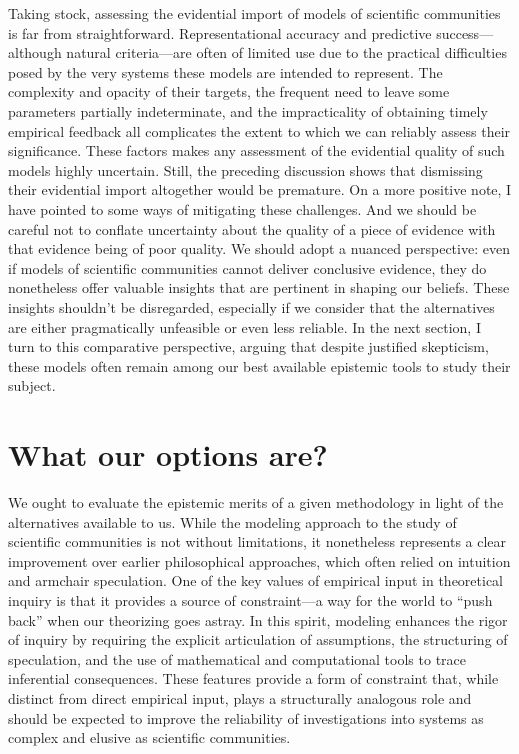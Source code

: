 \documentclass{article}
\begin{document}
Taking stock, assessing the evidential import of models of scientific communities is far from straightforward. Representational accuracy and predictive success—although natural criteria—are often of limited use due to the practical difficulties posed by the very systems these models are intended to represent. The complexity and opacity of their targets, the frequent need to leave some parameters partially indeterminate, and the impracticality of obtaining timely empirical feedback all complicates the extent to which we can reliably assess their significance. These factors makes any assessment of the evidential quality of such models highly uncertain. Still, the preceding discussion shows that dismissing their evidential import altogether would be premature. On a more positive note, I have pointed to some ways of mitigating these challenges. And we should be careful not to conflate uncertainty about the quality of a piece of evidence with that evidence being of poor quality. We should adopt a nuanced perspective: even if models of scientific communities cannot deliver conclusive evidence, they do nonetheless offer valuable insights that are pertinent in shaping our beliefs. These insights shouldn't be disregarded, especially if we consider that the alternatives are either pragmatically unfeasible or even less reliable. In the next section, I turn to this comparative perspective, arguing that despite justified skepticism, these models often remain among our best available epistemic tools to study their subject.


\section{What our options are?}

We ought to evaluate the epistemic merits of a given methodology in light of the alternatives available to us. While the modeling approach to the study of scientific communities is not without limitations, it nonetheless represents a clear improvement over earlier philosophical approaches, which often relied on intuition and armchair speculation. One of the key values of empirical input in theoretical inquiry is that it provides a source of constraint—a way for the world to “push back” when our theorizing goes astray. In this spirit, modeling enhances the rigor of inquiry by requiring the explicit articulation of assumptions, the structuring of speculation, and the use of mathematical and computational tools to trace inferential consequences. These features provide a form of constraint that, while distinct from direct empirical input, plays a structurally analogous role and should be expected to improve the reliability of investigations into systems as complex and elusive as scientific communities.
\end{document}
